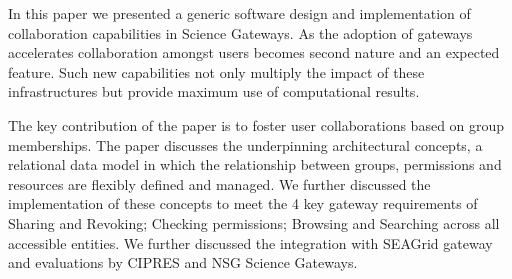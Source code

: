 \documentclass[sigconf]{acmart}
\begin{document}
In this paper we presented a generic software design and implementation of collaboration capabilities in Science Gateways. As the adoption of gateways accelerates collaboration amongst users becomes second nature and an expected feature. Such new capabilities not only multiply the impact of these infrastructures but provide maximum use of computational results. 

The key contribution of the paper is to foster user collaborations based on group memberships. The paper discusses the underpinning architectural concepts, a relational data model in which the relationship between groups, permissions and resources are flexibly defined and managed. We further discussed the implementation of these concepts to meet the 4 key gateway requirements of Sharing and Revoking; Checking permissions; Browsing and Searching across all accessible entities. We further discussed the integration with SEAGrid gateway and evaluations by CIPRES and NSG Science Gateways. 

%
%


 
\end{document}
